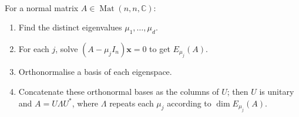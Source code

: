 \begin{method} \label{meth:finding-spectral-decomposition-normal-matrix} \\
For a normal matrix $A\in\operatorname{Mat}(n,n,\mathbb{C})$:
\begin{enumerate}[label=\roman*.]
\setlength{\itemsep}{0pt}
\item Find the distinct eigenvalues $\mu_1,\ldots,\mu_d$.
\item For each $j$, solve $(A-\mu_jI_n)\mathbf{x}=0$ to get $E_{\mu_j}(A)$.
\item Orthonormalise a basis of each eigenspace.
\item Concatenate these orthonormal bases as the columns of $U$; then $U$ is unitary and $A=U\Lambda U^*$, where $\Lambda$ repeats each $\mu_j$ according to $\dim E_{\mu_j}(A)$.
\end{enumerate}
\end{method}

